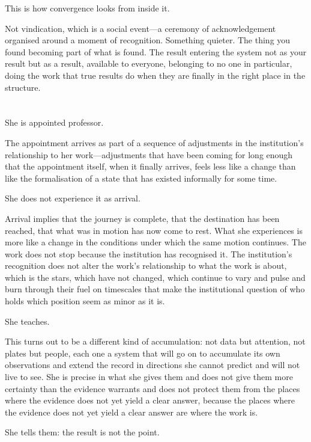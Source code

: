 This is how convergence looks from inside it.

Not vindication, which is a social event---a
ceremony of acknowledgement organised around
a moment of recognition. Something quieter.
The thing you found becoming part of what
is found. The result entering the system
not as your result but as a result, available
to everyone, belonging to no one in particular,
doing the work that true results do when they
are finally in the right place in the structure.

\section{}

She is appointed professor.

The appointment arrives as part of a sequence
of adjustments in the institution's relationship
to her work---adjustments that have been coming
for long enough that the appointment itself,
when it finally arrives, feels less like a change
than like the formalisation of a state that
has existed informally for some time.

She does not experience it as arrival.

Arrival implies that the journey is complete,
that the destination has been reached, that
what was in motion has now come to rest. What
she experiences is more like a change in the
conditions under which the same motion continues.
The work does not stop because the institution
has recognised it. The institution's recognition
does not alter the work's relationship to what
the work is about, which is the stars, which
have not changed, which continue to vary and
pulse and burn through their fuel on timescales
that make the institutional question of who
holds which position seem as minor as it is.

She teaches.

This turns out to be a different kind of
accumulation: not data but attention, not
plates but people, each one a system that
will go on to accumulate its own observations
and extend the record in directions she cannot
predict and will not live to see. She is
precise in what she gives them and does not
give them more certainty than the evidence
warrants and does not protect them from the
places where the evidence does not yet yield
a clear answer, because the places where the
evidence does not yet yield a clear answer
are where the work is.

She tells them: the result is not the point.

